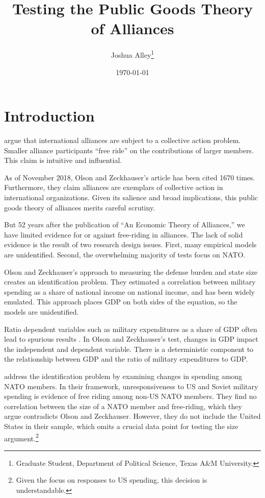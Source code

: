\documentclass[12pt]{article}
\title{
\textbf{Testing the Public Goods Theory of Alliances}
	}
\author{Joshua Alley\footnote{Graduate Student,
Department of Political Science, Texas A\&M University.}}
\date{{\normalsize \today}}
\begin{document}
\maketitle 

\doublespace



\section{Introduction}



\citet{OlsonZeckhauser1966} argue that international alliances are subject to a collective action problem. 
Smaller alliance participants ``free ride'' on the contributions of larger members. 
This claim is intuitive and influential. 


As of November 2018, Olson and Zeckhauser's article has been cited 1670 times.
Furthermore, they claim alliances are exemplars of collective action in international organizations. 
Given its salience and broad implications, this public goods theory of alliances merits careful scrutiny. 


But 52 years after the publication of ``An Economic Theory of Alliances,'' we have limited evidence for or against free-riding in alliances. 
The lack of solid evidence is the result of two research design issues. 
First, many empirical models are unidentified.
Second, the overwhelming majority of tests focus on NATO. 


Olson and Zeckhauser's approach to measuring the defense burden and state size creates an identification problem. 
They estimated a correlation between military spending as a share of national income on national income, and has been widely emulated. 
This approach places GDP on both sides of the equation, so the models are unidentified.


Ratio dependent variables such as military expenditures as a share of GDP often lead to spurious results \citep{Kronmal1993}. 
In Olson and Zeckhauser's test, changes in GDP impact the independent and dependent variable. 
There is a deterministic component to the relationship between GDP and the ratio of military expenditures to GDP. 


\citet{PluemperNeumayer2015} address the identification problem by examining changes in spending among NATO members. 
In their framework, unresponsiveness to US and Soviet military spending is evidence of free riding among non-US NATO members.
They find no correlation between the size of a NATO member and free-riding, which they argue contradicts Olson and Zeckhauser. 
However, they do not include the United States in their sample, which omits a crucial data point for testing the size argument.\footnote{Given the focus on responses to US spending, this decision is understandable.}
\end{document}
